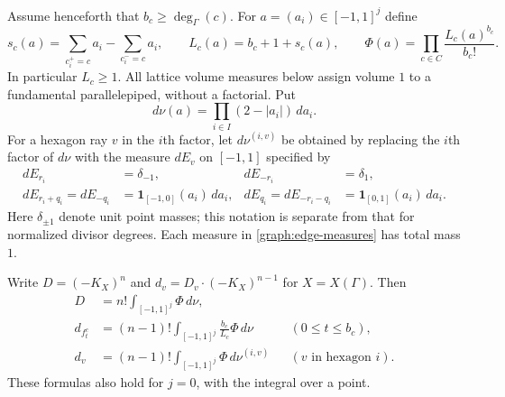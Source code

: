 Assume henceforth that $b_c\ge\deg_\Gamma(c)$.  For
$a=(a_i)\in[-1,1]^j$ define
\begin{equation}\label{graph:density}
 s_c(a)=\sum_{c_i^+=c}a_i-\sum_{c_i^-=c}a_i,
 \qquad L_c(a)=b_c+1+s_c(a),\qquad
 \Phi(a)=\prod_{c\in C}\frac{L_c(a)^{b_c}}{b_c!}.
\end{equation}
In particular $L_c\ge1$.  All lattice volume measures below assign
volume $1$ to a fundamental parallelepiped, without a factorial.
Put
\[
 d\nu(a)=\prod_{i\in I}(2-|a_i|)\,da_i.
\]
For a hexagon ray $v$ in the $i$th factor, let $d\nu^{(i,v)}$ be
obtained by replacing the $i$th factor of $d\nu$ with the measure
$dE_v$ on $[-1,1]$ specified by
\begin{equation}\label{graph:edge-measures}
 \begin{aligned}
 dE_{r_i}&=\delta_{-1},& dE_{-r_i}&=\delta_{1},\\
 dE_{r_i+q_i}=dE_{-q_i}&=\mathbf1_{[-1,0]}(a_i)\,da_i,
 &dE_{q_i}=dE_{-r_i-q_i}&=\mathbf1_{[0,1]}(a_i)\,da_i.
 \end{aligned}
\end{equation}
Here $\delta_{\pm1}$ denote unit point masses; this notation is separate
from that for normalized divisor degrees. Each measure in
\eqref{graph:edge-measures} has total mass $1$.

\begin{proposition}\label{graph:degree-formulas}
Write $D=(-K_X)^n$ and $d_v=D_v\cdot(-K_X)^{n-1}$ for $X=X(\Gamma)$.
Then
\begin{align}
 D&=n!\int_{[-1,1]^j}\Phi\,d\nu,\label{graph:volume-formula}\\
 d_{f^c_t}&=(n-1)!\int_{[-1,1]^j}\frac{b_c}{L_c}\Phi\,d\nu
       &&(0\le t\le b_c),\label{graph:base-degree}\\
 d_v&=(n-1)!\int_{[-1,1]^j}\Phi\,d\nu^{(i,v)}
       &&(v\text{ in hexagon }i).\label{graph:fibre-degree}
\end{align}
These formulas also hold for $j=0$, with the integral over a point.
\end{proposition}

